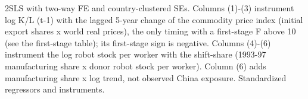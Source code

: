 \begin{table}[htbp]\centering
\caption{Instrumental-variable estimates}
\label{tab:iv}
\small
{}
\begin{tablenotes}\footnotesize 2SLS with two-way FE and country-clustered SEs. Columns (1)-(3) instrument log K/L (t-1) with the lagged 5-year change of the commodity price index (initial export shares x world real prices), the only timing with a first-stage F above 10 (see the first-stage table); its first-stage sign is negative. Columns (4)-(6) instrument the log robot stock per worker with the shift-share (1993-97 manufacturing share x donor robot stock per worker). Column (6) adds manufacturing share x log trend, not observed China exposure. Standardized regressors and instruments.\end{tablenotes}
\end{table}